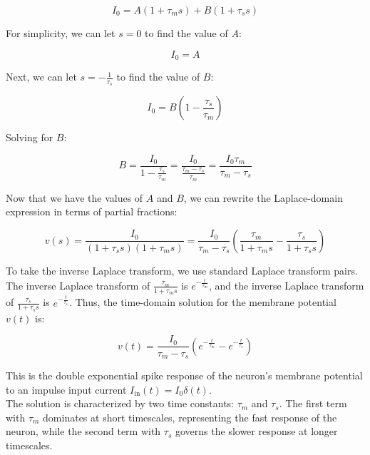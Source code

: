 \begin{equation}
    I_0 = A(1 + \tau_m s) + B(1 + \tau_s s)
\end{equation}

For simplicity, we can let $s = 0$ to find the value of $A$:

\begin{equation}
    I_0 = A
\end{equation}

Next, we can let $s = -\frac{1}{\tau_s}$ to find the value of $B$:

\begin{equation}
    I_0 = B\left(1 - \frac{\tau_s}{\tau_m}\right)
\end{equation}

Solving for $B$:

\begin{equation}
    B = \frac{I_0}{1 - \frac{\tau_s}{\tau_m}} = \frac{I_0}{\frac{\tau_m - \tau_s}{\tau_m}} = \frac{I_0 \tau_m}{\tau_m - \tau_s}
\end{equation}

Now that we have the values of $A$ and $B$, we can rewrite the Laplace-domain expression in terms of partial fractions:

\begin{equation}
    v(s) = \frac{I_0}{(1 + \tau_s s)(1 + \tau_m s)} = \frac{I_0}{\tau_m - \tau_s} \left(\frac{\tau_m}{1 + \tau_m s} - \frac{\tau_s}{1 + \tau_s s}\right)
\end{equation}

To take the inverse Laplace transform, we use standard Laplace transform pairs. The inverse Laplace transform of $\frac{\tau_m}{1 + \tau_m s}$ is $e^{-\frac{t}{\tau_m}}$, and the inverse Laplace transform of $\frac{\tau_s}{1 + \tau_s s}$ is $e^{-\frac{t}{\tau_s}}$. Thus, the time-domain solution for the membrane potential $v(t)$ is:

\begin{equation}
    v(t) = \frac{I_0}{\tau_m - \tau_s} \left(e^{-\frac{t}{\tau_m}} - e^{-\frac{t}{\tau_s}}\right)
\end{equation}

This is the double exponential spike response of the neuron's membrane potential to an impulse input current $I_{\text{in}}(t) = I_0 \delta(t)$. \\
The solution is characterized by two time constants: $\tau_m$ and $\tau_s$. The first term with $\tau_m$ dominates at short timescales, representing the fast response of the neuron, while the second term with $\tau_s$ governs the slower response at longer timescales.

